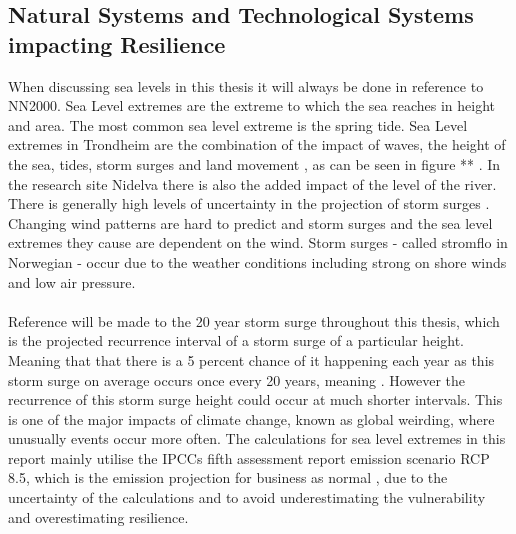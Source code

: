 \subsection{Natural Systems and Technological Systems impacting Resilience }
When discussing sea levels in this thesis it will always be done in reference to NN2000. Sea Level extremes are the extreme to which the sea reaches in height and area. The most common sea level extreme is the spring tide. Sea Level extremes in Trondheim are the combination of the impact of waves, the height of the sea, tides, storm surges and land movement \cite{hanssen-bauer_climate_2017}, as can be seen in figure ** . In the research site Nidelva there is also the added impact of the level of the river. There is generally high levels of uncertainty in the projection of storm surges \cite{nilsen_sealevelchangefornorway_nodate}. Changing wind patterns are hard to predict \cite{rod_three_2015} and storm surges and the sea level extremes they cause are dependent on the wind. Storm surges - called stromflo in Norwegian -  occur due to the weather conditions including strong on shore winds and low air pressure. \cite{hanssen_saksframlegg_2013'}

\paragraph{}

Reference will be made to the 20 year storm surge throughout this thesis, which is the projected recurrence interval of a storm surge of a particular height.  Meaning that that there is a 5 percent chance of it happening each year as this storm surge on average occurs once every 20 years, meaning \cite{hanssen_saksframlegg_2013}. However the recurrence of this storm surge height could occur at much shorter intervals.  This is one of the major impacts of climate change, known as global weirding, where unusually events occur more often. The calculations for sea level extremes in this report mainly utilise the IPCCs fifth assessment report emission scenario RCP 8.5, which is the emission projection for business as normal \cite{hanssen-bauer_climate_2017}, due to the uncertainty of the calculations and to avoid underestimating the vulnerability and overestimating resilience.  



